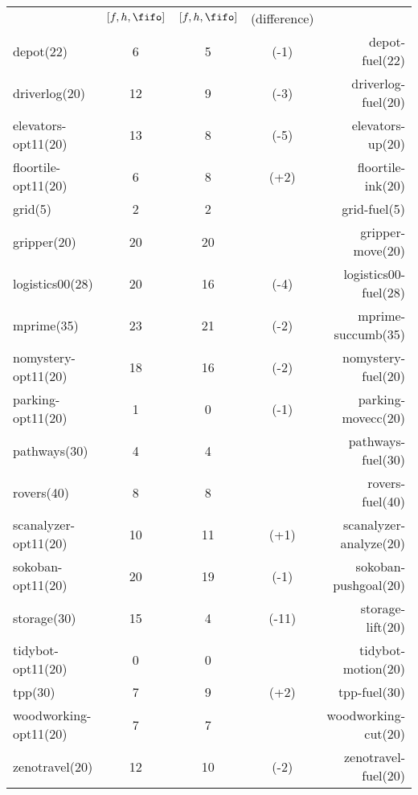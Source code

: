 \begin{center}
\begin{tabular}{|lc|ccr|}
 & $[f,h,\fifo]$ & $[f,h,\fifo]$ & (difference) & \\
depot(22) & 6 & 5 & (-1) & depot-fuel(22)\\
driverlog(20) & 12 & 9 & (-3) & driverlog-fuel(20)\\
elevators-opt11(20) & 13 & 8 & (-5) & elevators-up(20)\\
floortile-opt11(20) & 6 & 8 & (+2) & floortile-ink(20)\\
grid(5) & 2 & 2 &  & grid-fuel(5)\\
gripper(20) & 20 & 20 &  & gripper-move(20)\\
logistics00(28) & 20 & 16 & (-4) & logistics00-fuel(28)\\
mprime(35) & 23 & 21 & (-2) & mprime-succumb(35)\\
nomystery-opt11(20) & 18 & 16 & (-2) & nomystery-fuel(20)\\
parking-opt11(20) & 1 & 0 & (-1) & parking-movecc(20)\\
pathways(30) & 4 & 4 &  & pathways-fuel(30)\\
rovers(40) & 8 & 8 &  & rovers-fuel(40)\\
scanalyzer-opt11(20) & 10 & 11 & (+1) & scanalyzer-analyze(20)\\
sokoban-opt11(20) & 20 & 19 & (-1) & sokoban-pushgoal(20)\\
storage(30) & 15 & 4 & (-11) & storage-lift(20)\\
tidybot-opt11(20) & 0 & 0 &  & tidybot-motion(20)\\
tpp(30) & 7 & 9 & (+2) & tpp-fuel(30)\\
woodworking-opt11(20) & 7 & 7 &  & woodworking-cut(20)\\
zenotravel(20) & 12 & 10 & (-2) & zenotravel-fuel(20)\\
\end{tabular}
\end{center}
